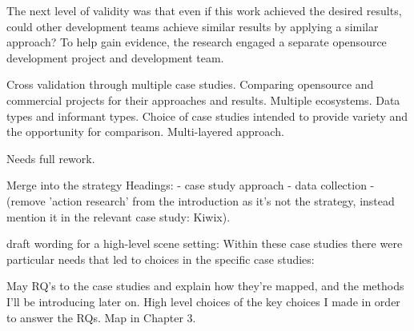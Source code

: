 The next level of validity was that even if this work achieved the desired results, could other development teams achieve similar results by applying a similar approach? To help gain evidence, the research engaged a separate opensource development project and development team. 

Cross validation through multiple case studies. Comparing opensource and commercial projects for their approaches and results. Multiple ecosystems. Data types and informant types. Choice of case studies intended to provide variety and the opportunity for comparison. Multi-layered approach.

Needs full rework.

Merge into the strategy
Headings: 
- case study approach
- data collection
- (remove 'action research' from the introduction as it's not the strategy, instead mention it in the relevant case study: Kiwix).

draft wording for a high-level scene setting: Within these case studies there were particular needs that led to choices in the specific case studies: 


May RQ's to the case studies and explain how they're mapped, and the methods I'll be introducing later on. High level choices of the key choices I made in order to answer the RQs. Map in Chapter 3.












